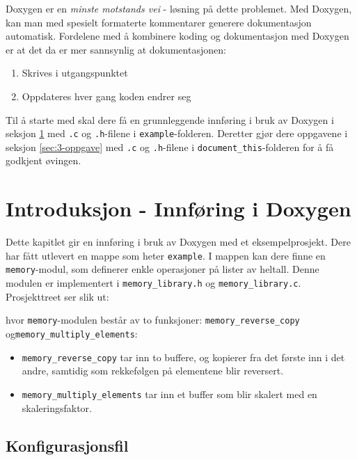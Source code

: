 \begin{alphasection}
Doxygen er en \textit{minste motstands vei} - løsning på dette problemet. Med Doxygen, kan man med spesielt formaterte kommentarer generere dokumentasjon automatisk. Fordelene med å kombinere koding og dokumentasjon med Doxygen er at det da er mer sannsynlig at dokumentasjonen:

\begin{enumerate}
    \item Skrives i utgangspunktet
    \item Oppdateres hver gang koden endrer seg
\end{enumerate}

Til å starte med skal dere få en grunnleggende innføring i bruk av Doxygen i seksjon \ref{sec:2-innføring} med \verb|.c| og \verb|.h|-filene i \verb|example|-folderen. Deretter gjør dere oppgavene i seksjon \ref{sec:3-oppgave} med \verb|.c| og \verb|.h|-filene i \verb|document_this|-folderen for å få godkjent øvingen. 



\section{Introduksjon - Innføring i Doxygen}\label{sec:2-innføring}

Dette kapitlet gir en innføring i bruk av Doxygen med et eksempelprosjekt. Dere har fått utlevert en mappe som heter \verb|example|. I mappen kan dere finne en \verb|memory|-modul, som definerer enkle operasjoner på lister av heltall. Denne modulen er implementert i \verb|memory_library.h| og \verb|memory_library.c|. Prosjekttreet ser slik ut:



hvor \verb|memory|-modulen består av to funksjoner: \verb|memory_reverse_copy| og\newline \verb|memory_multiply_elements|:
\begin{itemize}
    \item  \verb|memory_reverse_copy| tar inn to buffere, og kopierer fra det første inn i det andre, samtidig som rekkefølgen på elementene blir reversert. 
    \item \verb|memory_multiply_elements| tar inn et buffer som blir skalert med en skaleringsfaktor.
\end{itemize}


\subsection{Konfigurasjonsfil}  


\end{alphasection}
